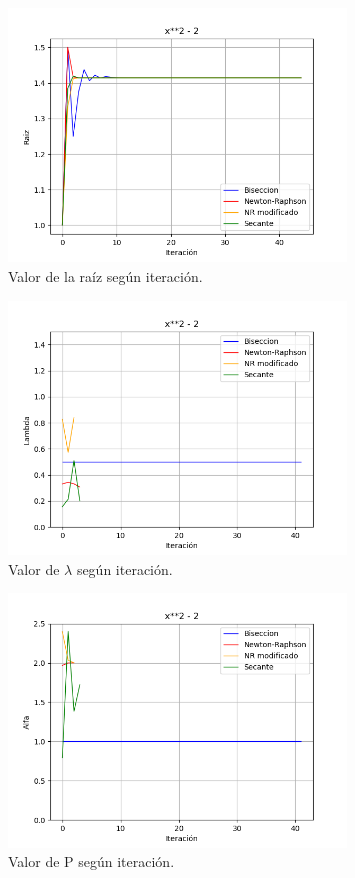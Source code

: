 \documentclass[titlepage,a4paper]{article}
\begin{document}
\begin{figure}[H]
\centering
\includegraphics[width=0.8\textwidth]{raiz f1.png}
\caption{\label{fig:raizf1}Valor de la raíz según iteración.}
\end{figure}

\begin{figure}[H]
    \centering
    \includegraphics[width=0.8\textwidth]{lambda f1.png}
    \caption{\label{fig:lambdaf1}Valor de $\lambda$ según iteración.}
\end{figure}
\begin{figure}[H]
    \centering
    \includegraphics[width=0.8\textwidth]{alfa f1.png}
    \caption{\label{fig:alfaf1}Valor de P según iteración.}
\end{figure}
\end{document}
